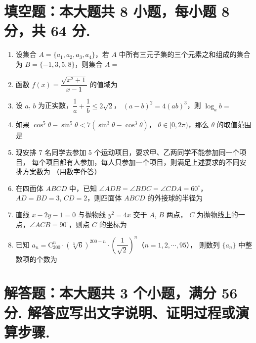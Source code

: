 \documentclass{chsmc}
\begin{document}
\section{填空题：本大题共 8 小题，每小题 8 分，共 64 分.}

\begin{enumerate}
	\item 设集合 $A = \{a_1,a_2,a_3,a_4\}$，若 $A$ 中所有三元子集的三个元素之和组成的集合为
		$B = \{-1,3,5,8\}$，则集合 $A =$ \blankline
	\item 函数 $f(x) = \dfrac{\sqrt{x^2+1}}{x-1}$ 的值域为 \blankline
	\item 设 $a$, $b$ 为正实数，$\dfrac{1}{a} + \dfrac{1}{b} \leqslant 2\sqrt{2}$，
		$(a-b)^2 = 4(ab)^3$，则 $\log_a b =$ \blankline
	\item 如果 $\cos^5\theta - \sin^5\theta < 7(\sin^3\theta - \cos^3\theta)$，
		$\theta \in [0,2\pi)$，那么 $\theta$ 的取值范围是 \blankline
	\item 现安排 $7$ 名同学去参加 $5$ 个运动项目，要求甲、乙两同学不能参加同一个项目，
		每个项目都有人参加，每人只参加一个项目，则满足上述要求的不同安排方案数为
		\blankline（用数字作答）
	\item 在四面体 $ABCD$ 中，已知 $\angle ADB = \angle BDC = \angle CDA = 60^\circ$，
		$AD = BD = 3$, $CD = 2$，则四面体 $ABCD$ 的外接球的半径为 \blankline
	\item 直线 $x - 2y - 1 = 0$ 与抛物线 $y^2 = 4x$ 交于 $A$, $B$ 两点，
		$C$ 为抛物线上的一点，$\angle ACB = 90^\circ$，则点 $C$ 的坐标为 \blankline
	\item 已知 $a_n = \mathrm{C}_{200}^n\cdot (\sqrt[3]{6})^{200-n}\cdot
		\left(\dfrac{1}{\sqrt{2}}\right)^n$（$n = 1,2,\cdots,95$），
		则数列 $\{a_n\}$ 中整数项的个数为 \blankline
\end{enumerate}

\section{解答题：本大题共 3 个小题，满分 56 分. 解答应写出文字说明、证明过程或演算步骤.}
\end{document}

